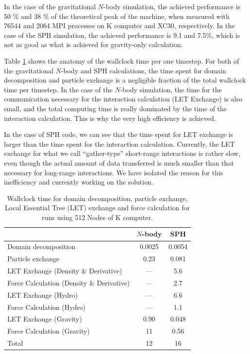 \documentclass[dvipdfmx]{acm_proc_article-sp}
\begin{document}
In the case of the gravitational $N$-body simulation, the achieved
performance is 50 \% and 38 \% of the theoretical peak of the machine,
when measured with 76544 and 2064 MPI processes on K computer and
XC30, respectively.  In the case of the SPH simulation, the achieved
performance is 9.1 and 7.5\%, which is not as good as what is achieved
for gravity-only calculation.

Table   \ref{tab:wallclocktime}
shows the anatomy of the wallclock time per one timestep. For both of
the gravitational $N$-body and SPH calculations, the time spent for
domain decomposition and particle exchange is a negligible fraction of
the total wallclock time per timestep. In the case of the $N$-body
simulation, the time for the communication necessary for the
interaction calculation (LET Exchange) is also small, and the total
computing time is really dominated by the time of the interaction
calculation. This is why the very high efficiency is achieved.

In the case of SPH code, we can see that the time spent for LET
exchange is larger than the time spent for the interaction
calculation.  Currently, the LET exchange for what we call
``gather-type'' short-range interactions is rather slow, even though
the actual amount of data transferred is much smaller than that
necessary for long-range interactions.  We have isolated the reason
for this inefficiency and currently working on the solution.

\begin{table}
  \begin{center}
  \label{tab:wallclocktime}
  \begin{tabular}{lcc}
    \hline
      & $N$-body & SPH\\
    \hline
    Domain decomposition & 0.0025 & 0.0054\\
    Particle exchange & 0.23 & 0.081\\
    LET Exchange  (Density \& Derivative)& --- & 5.6\\
    Force Calculation  (Density \& Derivative)& --- & 2.7\\
    LET Exchange  (Hydro)& --- & 6.6\\
    Force Calculation  (Hydro)& --- & 1.1\\
    LET Exchange  (Gravity)& 0.90 & 0.048\\
    Force Calculation (Gravity)& 11 & 0.56\\
    Total & 12 & 16\\
    \hline
  \end{tabular}
  \caption{Wallclock time for domain decomposition, particle exchange,
    Local Essential Tree (LET) exchange and  force calculation for
    runs using 512 Nodes of K computer.
  }
  \end{center}
\end{table}
\end{document}
